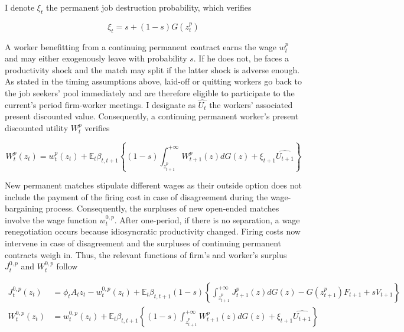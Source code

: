 I denote $\xi_t$ the permanent job destruction probability, which verifies
 
\begin{equation} \label{eq:def_xi}
\xi_t = s+(1-s) G\left(z_t^p\right)
\end{equation}

A worker benefitting from a continuing permanent contract earns the wage $w_{t}^{p}$ and may either exogenously leave with probability $s$. If he does not, he faces a productivity shock and the match may split if the latter shock is adverse enough. As stated in the timing assumptions above, laid-off or quitting workers go back to the job seekers' pool immediately and are therefore eligible to participate to the current's period firm-worker meetings. I designate as $\widehat{U_t}$ the workers' associated present discounted value. Consequently, a continuing permanent worker's present discounted utility $W_t^p$ verifies

\begin{equation} \label{eq:def_wp}
W_t^p \left( z_t \right) = w_{t}^{p} \left( z_t \right) + \mathbb{E}_{t} \beta_{t,t+1} \left\{ (1-s) \int_{z_{t+1}^p}^{+\infty} W_{t+1}^p ( z ) dG(z) + \xi_{t+1} \widehat{U_{t+1}} \right\}
\end{equation}

New permanent matches stipulate different wages as their outside option does not include the payment of the firing cost in case of disagreement during the wage-bargaining process. Consequently, the surpluses of new open-ended matches involve the wage function $w_t^{0,p}$. After one-period, if there is no separation, a wage renegotiation occurs because idiosyncratic productivity changed. Firing costs now intervene in case of disagreement and the surpluses of continuing permanent contracts weigh in. Thus, the relevant functions of firm's and worker's surplus $J_{t}^{0,p}$ and $W_t^{0,p}$ follow

\begin{align} \label{eq:def_j0p} 
J_t^{0,p} \left( z_{t} \right) &= \phi_t A_t z_{t} - w_{t}^{0,p} \left( z_t \right) + \mathbb{E}_{t} \beta_{t,t+1} (1-s) \left\{ \int_{z_{t+1}^p}^{+\infty} J_{t+1}^{p} \left( z \right) dG(z) - G\left(z_{t+1}^p\right) F_{t+1} + s V_{t+1} \right\}\\
W_t^{0,p} \left( z_t \right) &= w_{t}^{0,p} \left( z_t \right) + \mathbb{E}_{t} \beta_{t,t+1} \left\{ (1-s) \int_{z_{t+1}^p}^{+\infty} W_{t+1}^p ( z ) dG(z) + \xi_{t+1} \widehat{U_{t+1}} \right\}
\end{align} 

